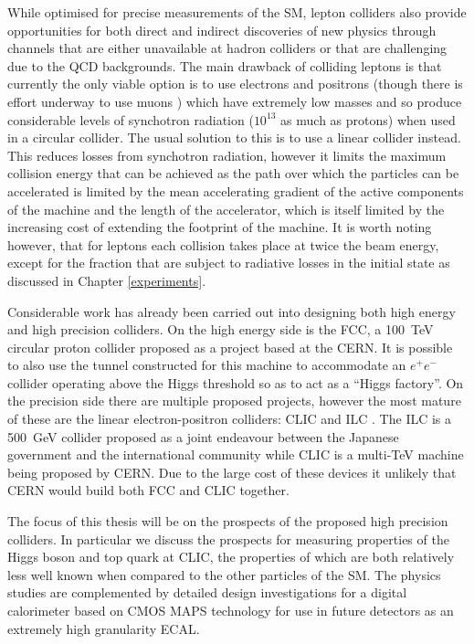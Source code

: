 While optimised for precise measurements of the \ac{SM}, lepton colliders also provide opportunities for both direct and indirect discoveries of new physics through channels that are either unavailable at hadron colliders or that are challenging due to the \ac{QCD} backgrounds. The main drawback of colliding leptons is that currently the only viable option is to use electrons and positrons (though there is effort underway to use muons \cite{Bogomilov:2017vwz}) which have extremely low masses and so produce considerable levels of synchotron radiation (${10^{13}}$ as much as protons) when used in a circular collider. The usual solution to this is to use a linear collider instead. This reduces losses from synchotron radiation, however it limits the maximum collision energy that can be achieved as the path over which the particles can be accelerated is limited by the mean accelerating gradient of the active components of the machine and the length of the accelerator, which is itself limited by the increasing cost of extending the footprint of the machine. It is worth noting however, that for leptons each collision takes place at twice the beam energy, except for the fraction that are subject to radiative losses in the initial state as discussed in Chapter \ref{experiments}.

Considerable work has already been carried out into designing both high energy and high precision colliders. On the high energy side is the \ac{FCC}, a 100~TeV circular proton collider proposed as a project based at the \ac{CERN}. It is possible to also use the tunnel constructed for this machine to accommodate an $e^+e^-$ collider operating above the Higgs threshold so as to act as a ``Higgs factory''. On the precision side there are multiple proposed projects, however the most mature of these are the linear electron-positron colliders: \ac{CLIC} \cite{CLIC:2016zwp} and \ac{ILC} \cite{Behnke:2013xla}. The \ac{ILC} is a 500~GeV collider proposed as a joint endeavour between the Japanese government and the international community while \ac{CLIC} is a multi-TeV machine being proposed by \ac{CERN}. Due to the large cost of these devices it unlikely that \ac{CERN} would build both \ac{FCC} and \ac{CLIC} together.

The focus of this thesis will be on the prospects of the proposed high precision colliders. In particular we discuss the prospects for measuring properties of the Higgs boson and top quark at \ac{CLIC}, the properties of which are both relatively less well known when compared to the other particles of the \ac{SM}. The physics studies are complemented by detailed design investigations for a digital calorimeter based on \ac{CMOS} \ac{MAPS} technology for use in future detectors as an extremely high granularity \ac{ECAL}.  


 
